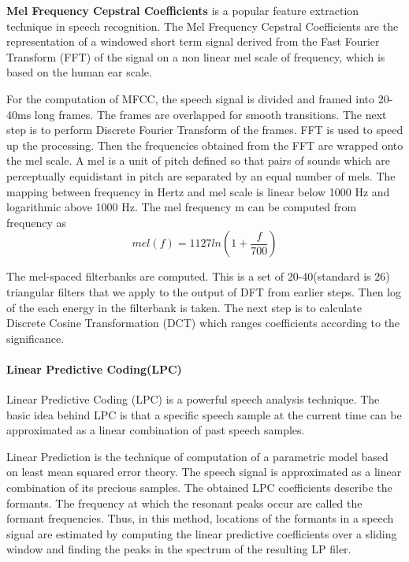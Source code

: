 \textbf{Mel Frequency Cepstral Coefficients} is a popular feature extraction technique in speech recognition. The Mel Frequency Cepstral Coefficients are the representation of a windowed short term signal derived from the Fast Fourier Transform (FFT) of the signal on a non linear mel scale of frequency, which is based on the human ear scale.


For the computation of MFCC, the speech signal is divided and framed into 20-40ms long frames. The frames are overlapped for smooth transitions. The next step is to perform Discrete Fourier Transform of the frames. FFT is used to speed up the processing. Then the frequencies obtained from the FFT are wrapped onto the mel scale. A mel is a unit of pitch defined so that pairs of sounds which are perceptually equidistant in pitch are separated by an equal number of mels. The mapping between frequency in Hertz and mel scale is linear below 1000 Hz and logarithmic above 1000 Hz. The mel frequency m can be computed from frequency as 
\begin{equation}
mel(f)=1127ln(1+\frac{f}{700})
\end{equation}

The mel-spaced filterbanks are computed. This is a set of 20-40(standard is 26) triangular filters that we apply to the output of DFT from earlier steps. Then log of the each energy in the filterbank is taken. The next step is to calculate Discrete Cosine Transformation (DCT) which ranges coefficients according to the significance.

\paragraph{Linear Predictive Coding(LPC)} \mbox{}


Linear Predictive Coding (LPC) is a powerful speech analysis technique. The basic idea behind LPC is that a specific speech sample at the current time can be approximated as a linear combination of past speech samples.

Linear Prediction is the technique of computation of a parametric model based on least mean squared error theory. The speech signal is approximated as a linear combination of its precious samples. The obtained LPC coefficients describe the formants. The frequency at which the resonant peaks occur are called the formant frequencies. Thus, in this method, locations of the formants in a speech signal are estimated by computing the linear predictive coefficients over a sliding window and finding the peaks in the spectrum of the resulting LP filer.\\
